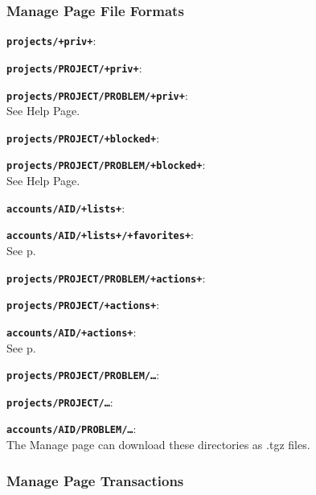 \documentclass[12pt]{article}
\newenvironment{indpar}[1][0.4in]%
	{\begin{list}{}%
		     {\setlength{\itemsep}{0in}%
		      \setlength{\topsep}{0in}%
		      \setlength{\parsep}{1ex}%
		      \setlength{\labelwidth}{#1}%
		      \setlength{\leftmargin}{#1}%
		      \addtolength{\leftmargin}{\labelsep}}%
	 \item}%
	{\end{list}}
\newenvironment{itemlist}[1][0.2in]%
	{\begin{list}{}{\setlength{\labelwidth}{#1}%
		        \setlength{\leftmargin}{\labelwidth}%
		        \addtolength{\leftmargin}{+0.2in}%
		        \addtolength{\linewidth}{-\labelwidth}%
		        \addtolength{\linewidth}{-0.2in}%
		        \renewcommand{\makelabel}[1]{##1\hfill}}
	 \raggedright}%
	{\end{list}}
\newcommand{\TT}[1]{{\tt \bfseries #1}}
\newcommand{\pagref}[1]{p\pageref{#1}}
\begin{document}
\subsubsection{Manage Page File Formats}

\begin{indpar}
\begin{itemlist}
\item[\TT{projects/+priv+}:]
\item[\TT{projects/PROJECT/+priv+}:]\vspace*{-1ex}~
\item[\TT{projects/PROJECT/PROBLEM/+priv+}:]\vspace*{-1ex}~
\label{PRIV} \\
See Help Page.
\item[\TT{projects/PROJECT/+blocked+}:]
\item[\TT{projects/PROJECT/PROBLEM/+blocked+}:]\vspace*{-1ex}~
\label{BLOCKED} \\
See Help Page.
\item[\TT{accounts/AID/+lists+}:]
\item[\TT{accounts/AID/+lists+/+favorites+}:]\vspace*{-1ex}~ \\
See \pagref{FAVORITES}.
\item[\TT{projects/PROJECT/PROBLEM/+actions+}:]
\item[\TT{projects/PROJECT/+actions+}:]\vspace*{-1ex}
\item[\TT{accounts/AID/+actions+}:]\vspace*{-1ex}~ \\
See \pagref{ACCOUNT-ACTIONS}.
\item[\TT{projects/PROJECT/PROBLEM/\ldots}:]
\item[\TT{projects/PROJECT/\ldots}:]\vspace*{-1ex}
\item[\TT{accounts/AID/PROBLEM/\ldots}:]\vspace*{-1ex} ~ \\
    The Manage page can download these directories as .tgz files.

\end{itemlist}
\end{indpar}

\subsubsection{Manage Page Transactions}
\end{document}
